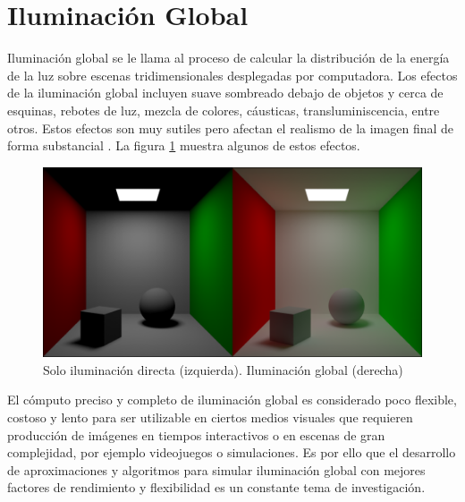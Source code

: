 \section{Iluminación Global}

Iluminación global se le llama al proceso de calcular la distribución de la energía de la luz sobre escenas tridimensionales desplegadas por computadora. Los efectos de la iluminación global incluyen suave sombreado debajo de objetos y cerca de esquinas, rebotes de luz, mezcla de colores, cáusticas, transluminiscencia, entre otros. Estos efectos son muy sutiles pero afectan el realismo de la imagen final de forma substancial \cite{pixar_renderman_intro}. La figura \ref{fig:gi_comparison} muestra algunos de estos efectos.

\begin{figure}[H]
	\centering
	\includegraphics[width=0.985\linewidth]{media/direct_vs_indirect.png}
	\caption{Solo iluminación directa (izquierda). Iluminación global (derecha)}
	\label{fig:gi_comparison}
\end{figure}

El cómputo preciso y completo de iluminación global es considerado poco flexible, costoso y lento para ser utilizable en ciertos medios visuales que requieren producción de imágenes en tiempos interactivos o en escenas de gran complejidad, por ejemplo videojuegos o simulaciones. Es por ello que el desarrollo de aproximaciones y algoritmos para simular iluminación global con mejores factores de rendimiento y flexibilidad es un constante tema de investigación.
